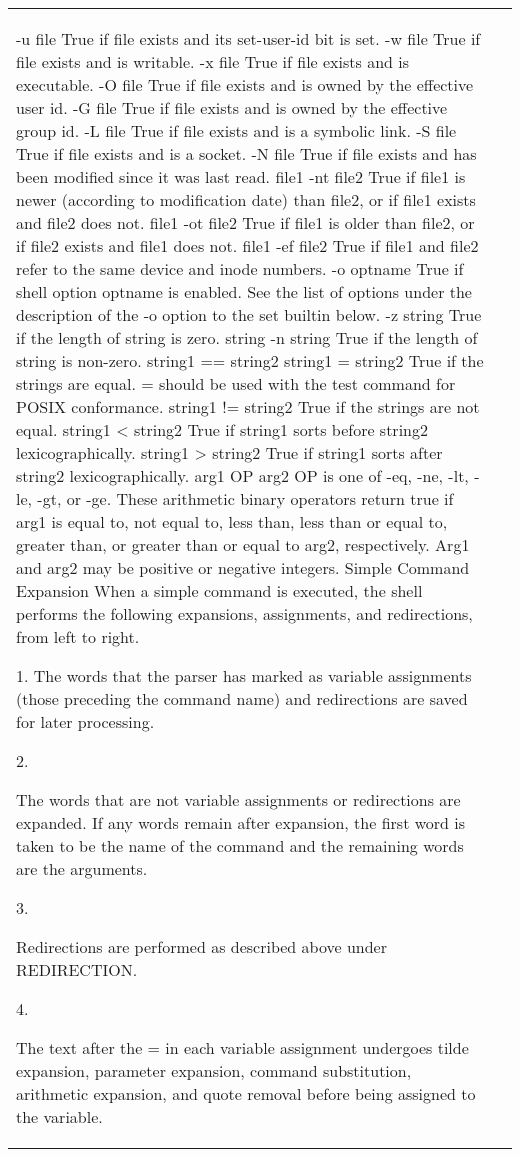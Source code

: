 \documentclass[11pt]{article}
\begin{document}
\begin{longtable}{p{}p{}}
{{{-u file
True if file exists and its set-user-id bit is set.
-w file
True if file exists and is writable.
-x file
True if file exists and is executable.
-O file
True if file exists and is owned by the effective user id.
-G file
True if file exists and is owned by the effective group id.
-L file
True if file exists and is a symbolic link.
-S file
True if file exists and is a socket.
-N file
True if file exists and has been modified since it was last read.
file1 -nt file2
True if file1 is newer (according to modification date) than file2, or if file1 exists and file2 does not.
file1 -ot file2
True if file1 is older than file2, or if file2 exists and file1 does not.
file1 -ef file2
True if file1 and file2 refer to the same device and inode numbers.
-o optname
True if shell option optname is enabled. See the list of options under the description of the -o option to the set builtin below.
-z string
True if the length of string is zero.
string
-n string
True if the length of string is non-zero.
string1 == string2
string1 = string2
True if the strings are equal. = should be used with the test command for POSIX conformance.
string1 != string2
True if the strings are not equal.
string1 < string2
True if string1 sorts before string2 lexicographically.
string1 > string2
True if string1 sorts after string2 lexicographically.
arg1 OP arg2
OP is one of -eq, -ne, -lt, -le, -gt, or -ge. These arithmetic binary operators return true if arg1 is equal to, not equal to, less than, less than or equal to, greater than, or greater than or equal to arg2, respectively. Arg1 and arg2 may be positive or negative integers.
Simple Command Expansion
When a simple command is executed, the shell performs the following expansions, assignments, and redirections, from left to right.

1.
The words that the parser has marked as variable assignments (those preceding the command name) and redirections are saved for later processing.

2.

The words that are not variable assignments or redirections are expanded. If any words remain after expansion, the first word is taken to be the name of the command and the remaining words are the arguments.

3.

Redirections are performed as described above under REDIRECTION.

4.

The text after the = in each variable assignment undergoes tilde expansion, parameter expansion, command substitution, arithmetic expansion, and quote removal before being assigned to the variable.

}}}
\end{longtable}
\end{document}
